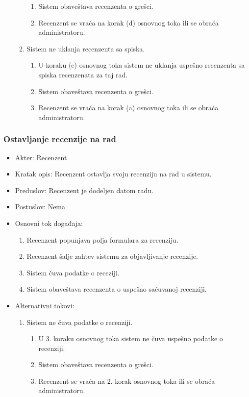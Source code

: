 \documentclass[a4paper]{article}
\begin{document}
\begin{itemize}
\begin{enumerate}
\begin{enumerate}
                \item Sistem obaveštava recenzenta o grešci.
                \item Recenzent se vraća na korak (d) osnovnog toka ili se obraća administratoru.
            \end{enumerate}
            \item Sistem ne uklanja recenzenta sa spiska.
            \begin{enumerate}
                \item U koraku (e) osnovnog toka sistem ne uklanja uspešno recenzenta sa spiska recenzenata za taj rad.
                \item Sistem obaveštava recenzenta o grešci.
                \item Recenzent se vraća na korak (a) osnovnog toka ili se obraća administratoru.
            \end{enumerate}
        \end{enumerate}
\end{itemize}

\subsubsection{Ostavljanje recenzije na rad}
\begin{itemize}
    \item Akter: Recenzent
    \item Kratak opis: Recenzent ostavlja svoju recenziju na rad u sistemu.
    \item Preduslov: Recenzent je dodeljen datom radu.
    \item Postuslov: Nema
    \item Osnovni tok događaja:
        \begin{enumerate}
            \item Recenzent popunjava polja formulara za recenziju.
            \item Recenzent šalje zahtev sistemu za objavljivanje recenzije.
            \item Sistem čuva podatke o receziji.
            \item Sistem obaveštava recenzenta o uspešno sačuvanoj recenziji.
        \end{enumerate}
    \item Alternativni tokovi:
        \begin{enumerate}
            \item Sistem ne čuva podatke o recenziji.
            \begin{enumerate}
                \item U 3. koraku osnovnog toka sistem ne čuva uspešno podatke o recenziji.
                \item Sistem obaveštava recenzenta o grešci.
                \item Recenzent se vraća na 2. korak osnovnog toka ili se obraća administratoru.
            \end{enumerate}
        \end{enumerate}
\end{itemize}
\end{document}
